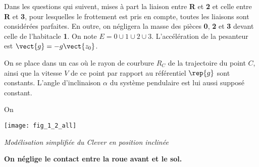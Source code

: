 \begin{multicols}{2}
Dans les questions qui suivent, mises à part la liaison entre \textbf{R} et \textbf{2} et celle entre \textbf{R} et \textbf{3}, pour lesquelles le frottement est pris en compte, toutes les liaisons sont considérées parfaites. En outre, on négligera la masse des pièces \textbf{0}, \textbf{2} et \textbf{3} devant celle de l'habitacle \textbf{1}. On note $E=0\cup 1 \cup 2 \cup 3$. L'accélération de la pesanteur est  $\vect{g}=-g\vect{z_0}$.

On se place dans un cas où le rayon de courbure $R_C$ de la trajectoire du point $C$, ainsi que la vitesse $V$ de ce point par rapport au référentiel $\rep{g}$ sont constants. L'angle d'inclinaison $\alpha$  du système pendulaire est lui aussi supposé constant.



\ifprof
\begin{corrige}
\end{corrige}
\else
\fi


\ifprof
\begin{corrige}
\end{corrige}
\else
\fi

On 

\begin{center}%
\centering
\texttt{[image: fig\_1\_2\_all]}

\textit{Modélisation simplifiée du Clever en position inclinée}
\label{fig_1_2}
\end{center}
 
 \textbf{On néglige le contact entre la roue avant et le sol.}
 
\ifprof
\begin{corrige}
\end{corrige}
\else
\fi

\ifprof
\begin{corrige}
\end{corrige}
\else
\fi


\end{multicols}
